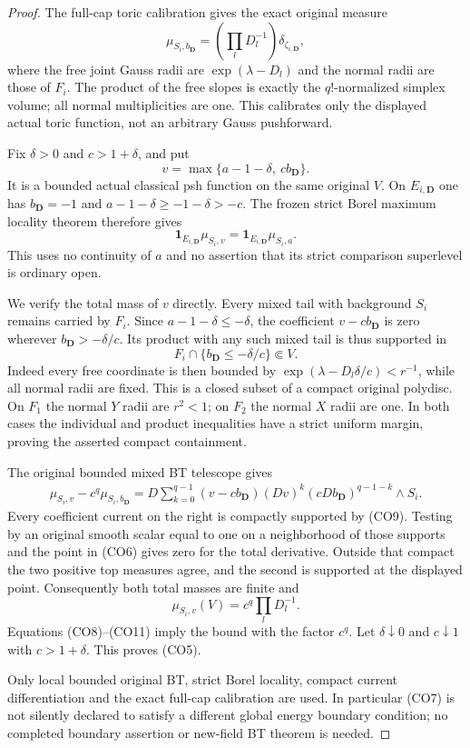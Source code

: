 \begin{proof}
The full-cap toric calibration gives the exact original measure
\[
  \mu_{S_i,b_{\mathbf D}}
       =\left(\prod_lD_l^{-1}\right)\delta_{\zeta_{i,\mathbf D}},
 \tag{CO6}
\]
where the free joint Gauss radii are $\exp(\lambda-D_l)$ and
the normal radii are those of $F_i$. The product of the free slopes
is exactly the $q!$-normalized simplex volume; all normal
multiplicities are one. This calibrates only the displayed actual
toric function, not an arbitrary Gauss pushforward.

Fix $\delta>0$ and $c>1+\delta$, and put
\[
               v=\max\{a-1-\delta,\ c b_{\mathbf D}\}.
 \tag{CO7}
\]
It is a bounded actual classical psh function on the same original
$V$. On $E_{i,\mathbf D}$ one has $b_{\mathbf D}=-1$ and
$a-1-\delta\ge-1-\delta>-c$. The frozen strict Borel maximum
locality theorem therefore gives
\[
             \mathbf1_{E_{i,\mathbf D}}\mu_{S_i,v}
                   =\mathbf1_{E_{i,\mathbf D}}\mu_{S_i,a}.
 \tag{CO8}
\]
This uses no continuity of $a$ and no assertion that its strict
comparison superlevel is ordinary open.

We verify the total mass of $v$ directly. Every mixed tail with
background $S_i$ remains carried by $F_i$. Since $a-1-\delta\le-\delta$,
the coefficient $v-cb_{\mathbf D}$ is zero wherever
$b_{\mathbf D}>-\delta/c$. Its product with any such mixed tail
is thus supported in
\[
                  F_i\cap\{b_{\mathbf D}\le-\delta/c\}\Subset V.
 \tag{CO9}
\]
Indeed every free coordinate is then bounded by
$\exp(\lambda-D_l\delta/c)<r^{-1}$, while all normal radii
are fixed. This is a closed subset of a compact original
polydisc. On $F_1$ the normal $Y$ radii are $r^2<1$;
on $F_2$ the normal $X$ radii are one. In both cases the
individual and product inequalities have a strict uniform
margin, proving the asserted compact containment.

The original bounded mixed BT telescope gives
\[
 \begin{split}
 \mu_{S_i,v}-c^q\mu_{S_i,b_{\mathbf D}}
  =D\sum_{k=0}^{q-1}
       (v-cb_{\mathbf D})(Dv)^k
                (cDb_{\mathbf D})^{q-1-k}\wedge S_i.
 \end{split}
 \tag{CO10}
\]
Every coefficient current on the right is compactly supported
by (CO9). Testing by an original smooth scalar equal to one on
a neighborhood of those supports and the point in (CO6) gives
zero for the total derivative. Outside that compact the two
positive top measures agree, and the second is supported at
the displayed point. Consequently both total masses are finite and
\[
               \mu_{S_i,v}(V)=c^q\prod_lD_l^{-1}.
 \tag{CO11}
\]
Equations (CO8)--(CO11) imply the bound with the factor $c^q$.
Let $\delta\downarrow0$ and $c\downarrow1$ with $c>1+\delta$.
This proves (CO5).

Only local bounded original BT, strict Borel locality, compact
current differentiation and the exact full-cap calibration are
used. In particular (CO7) is not silently declared to satisfy
a different global energy boundary condition; no completed
boundary assertion or new-field BT theorem is needed.
\end{proof}

